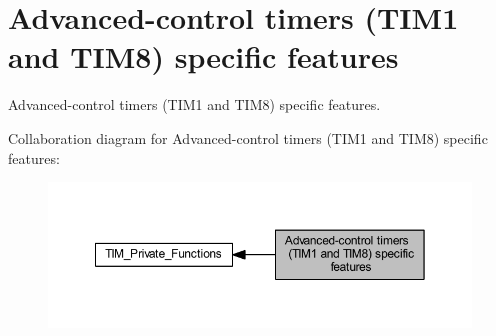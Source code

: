\hypertarget{group___t_i_m___group4}{}\section{Advanced-\/control timers (T\+I\+M1 and T\+I\+M8) specific features}
\label{group___t_i_m___group4}


Advanced-\/control timers (T\+I\+M1 and T\+I\+M8) specific features.  


Collaboration diagram for Advanced-\/control timers (T\+I\+M1 and T\+I\+M8) specific features\+:
\nopagebreak
\begin{figure}[H]
\begin{center}
\leavevmode
\includegraphics[width=350pt]{group___t_i_m___group4}
\end{center}
\end{figure}
